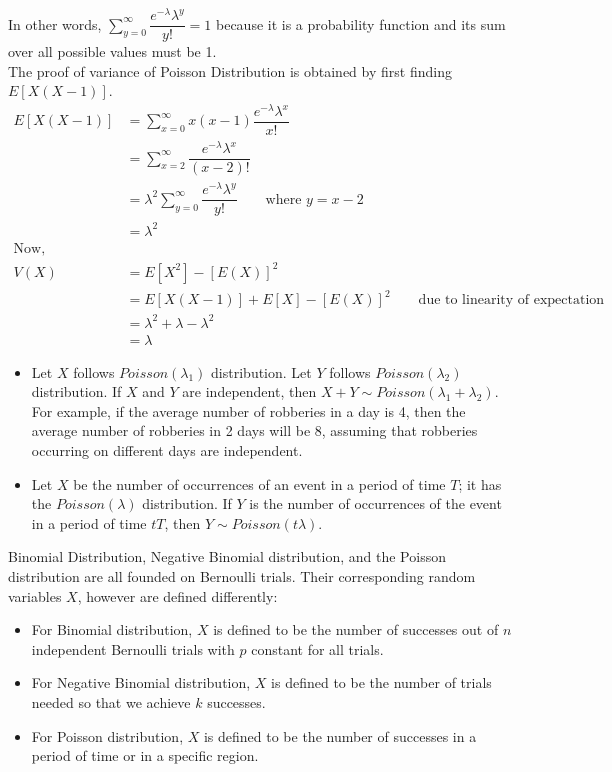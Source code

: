 In other words, $\sum_{y = 0}^{\infty}\dfrac{e^{-\lambda}\lambda^y}{y!} = 1$ because it is a probability function and its sum over all possible values must be 1. \\
The proof of variance of Poisson Distribution is obtained by first finding $E[X(X - 1)]$.
\begin{equation*}
    \begin{split}
        E[X(X - 1)] &= \sum_{x = 0}^{\infty}x(x-1)\dfrac{e^{-\lambda}\lambda^x}{x!} \\
        &= \sum_{x = 2}^{\infty}\dfrac{e^{-\lambda}\lambda^x}{(x-2)!} \\
        &= \lambda^2 \sum_{y = 0}^{\infty}\dfrac{e^{-\lambda}\lambda^y}{y!} \qquad \text{where } y = x - 2 \\
        &= \lambda^2 \\
        \text{Now, } \\
        V(X) &= E[X^2] - [E(X)]^2 \\
        &= E[X(X - 1)] + E[X] - [E(X)]^2 \qquad \text{due to linearity of expectation}\\
        &= \lambda^2 + \lambda - \lambda^2 \\
        &= \lambda
    \end{split}
\end{equation*}
\begin{note}
\end{note}
\begin{itemize}
    \item Let $X$ follows $Poisson(\lambda_1)$ distribution. Let $Y$ follows $Poisson(\lambda_2)$ distribution. If $X$ and $Y$ are independent, then $X + Y \sim Poisson(\lambda_1 + \lambda_2)$. \\
    For example, if the average number of robberies in a day is 4, then the average number of robberies in 2 days will be 8, assuming that robberies occurring on different days are independent.
    \item Let $X$ be the number of occurrences of an event in a period of time $T$; it has the $Poisson(\lambda)$ distribution. If $Y$ is the number of occurrences of the event in a period of time $tT$, then $Y \sim Poisson(t\lambda)$.
\end{itemize}
\begin{note}
\end{note}
Binomial Distribution, Negative Binomial distribution, and the Poisson distribution are all founded on Bernoulli trials. Their corresponding random variables $X$, however are defined differently:
\begin{itemize}
    \item For Binomial distribution, $X$ is defined to be the number of successes out of $n$ independent Bernoulli trials with $p$ constant for all trials.
    \item For Negative Binomial distribution, $X$ is defined to be the number of trials needed so that we achieve $k$ successes.
    \item For Poisson distribution, $X$ is defined to be the number of successes in a period of time or in a specific region.
\end{itemize}

